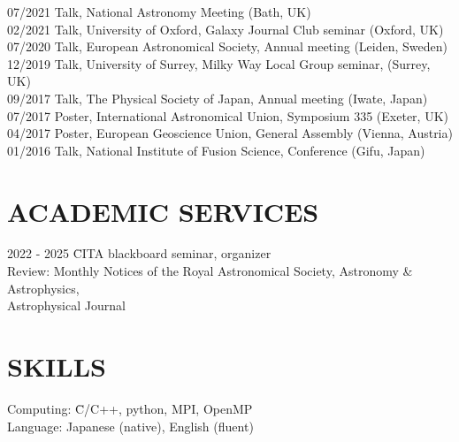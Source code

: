 \documentclass[]{res}
\begin{document}
\begin{resume}
\begin{tabbing}
    07/2021 \hspace{2mm} \>Talk, National Astronomy Meeting (Bath, UK)\\
    02/2021 \hspace{2mm} \>Talk, University of Oxford, Galaxy Journal Club seminar (Oxford, UK)\\
    07/2020 \hspace{2mm} \>Talk, European Astronomical Society, Annual meeting (Leiden, Sweden)\\
    12/2019 \hspace{2mm} \>Talk, University of Surrey, Milky Way Local Group seminar, (Surrey, UK)\\
    09/2017 \hspace{2mm} \>Talk, The Physical Society of Japan, Annual meeting (Iwate, Japan)\\
    07/2017 \hspace{2mm} \>Poster, International Astronomical Union, Symposium 335 (Exeter, UK)\\
    04/2017 \hspace{2mm} \>Poster, European Geoscience Union, General Assembly (Vienna, Austria)\\
    01/2016 \hspace{2mm} \>Talk, National Institute of Fusion Science, Conference (Gifu, Japan)
\end{tabbing}

\section{ACADEMIC SERVICES}
\noindent
\begin{tabbing}
    2022 - 2025 \hspace{2mm} \=CITA blackboard seminar, organizer\\
    Review: \>Monthly Notices of the Royal Astronomical Society, Astronomy \& Astrophysics, \\
    \>Astrophysical Journal
\end{tabbing}

\section{SKILLS}
\noindent
\begin{tabbing}
    Computing: \=C/C++, python, MPI, OpenMP \\
    Language: \>Japanese (native), English (fluent)
\end{tabbing}



\end{resume}
\end{document}
